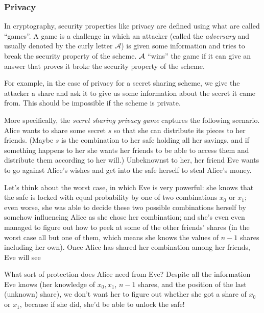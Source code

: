 \subsubsection{Privacy}

In cryptography, security properties like privacy are defined using what 
are called ``games''. A game is a challenge in which an attacker (called 
the \emph{adversary} and usually denoted by the curly letter $\mathcal{A}$) is given 
some information and tries to break the security property of the scheme. 
$\mathcal{A}$ ``wins'' the game if it can give an answer that proves it broke 
the security property of the scheme. 

For example, in the case of privacy for a secret sharing scheme, we give 
the attacker a share and ask it to give us some information about the 
secret it came from. This should be impossible if the scheme is 
private.

More specifically, the \emph{secret sharing privacy game} captures 
the following scenario. Alice wants to share some secret $s$ so that she
can distribute its pieces to her friends. (Maybe $s$ is the combination to
her safe holding all her savings, and if something happens to her she wants
her friends to be able to access them and distribute them according to
her will.) Unbeknownst to her, her friend Eve wants to go against Alice's
wishes and get into the safe herself to steal Alice's money.

Let's think about the worst case, in which Eve is very powerful: she knows 
that the safe is locked with equal probability by one of two combinations
$x_0$ or $x_1$; even worse, she was able to decide these two possible combinations herself by 
somehow influencing Alice as she chose her combination; and she's even 
even managed to figure out how to peek at some of the other friends' shares
(in the worst case all but one of them, which means she knows the values of $n-1$ shares including her own).
Once Alice has shared her
combination among her friends, Eve will see 

What sort of protection does Alice need from Eve? Despite all the information 
Eve knows (her knowledge of $x_0, x_1$, $n-1$ shares, and the position of the last (unknown) share), we don't want her to figure
out whether she got a share of $x_0$ or $x_1$, because if she did, she'd
be able to unlock the safe!

